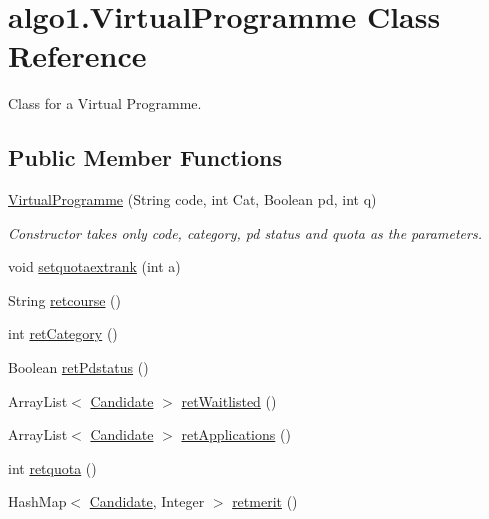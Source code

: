 \hypertarget{classalgo1_1_1VirtualProgramme}{\section{algo1.\+Virtual\+Programme Class Reference}
\label{classalgo1_1_1VirtualProgramme}
}


Class for a Virtual Programme.  


\subsection*{Public Member Functions}
\begin{DoxyCompactItemize}
\item 
\hyperlink{classalgo1_1_1VirtualProgramme_a4ca5f10194550ca6a878285fc0e32d5d}{Virtual\+Programme} (String code, int Cat, Boolean pd, int q)
\begin{DoxyCompactList}\small\item\em Constructor takes only code, category, pd status and quota as the parameters. \end{DoxyCompactList}\item 
void \hyperlink{classalgo1_1_1VirtualProgramme_a971912df704eaaca686fb261cee96d0f}{setquotaextrank} (int a)
\item 
String \hyperlink{classalgo1_1_1VirtualProgramme_a49d9e5e9ede49143244131bb8c89aa62}{retcourse} ()
\item 
int \hyperlink{classalgo1_1_1VirtualProgramme_a366eefb773a07488d3e72742a6a2e899}{ret\+Category} ()
\item 
Boolean \hyperlink{classalgo1_1_1VirtualProgramme_a826f7a9658a194569cd7abfa72d3b313}{ret\+Pdstatus} ()
\item 
Array\+List$<$ \hyperlink{classalgo1_1_1Candidate}{Candidate} $>$ \hyperlink{classalgo1_1_1VirtualProgramme_aa112fb4a6e20002145490bd39bcf3982}{ret\+Waitlisted} ()
\item 
Array\+List$<$ \hyperlink{classalgo1_1_1Candidate}{Candidate} $>$ \hyperlink{classalgo1_1_1VirtualProgramme_a52c76ebeb5a243bf81d4f08b1aec04f2}{ret\+Applications} ()
\item 
int \hyperlink{classalgo1_1_1VirtualProgramme_af4d22578b4bcd68e5ab81a13a5d8aebc}{retquota} ()
\item 
Hash\+Map$<$ \hyperlink{classalgo1_1_1Candidate}{Candidate}, Integer $>$ \hyperlink{classalgo1_1_1VirtualProgramme_ac242c6605d888eb982b3c904965d3385}{retmerit} ()
\item 

\end{DoxyCompactItemize}

